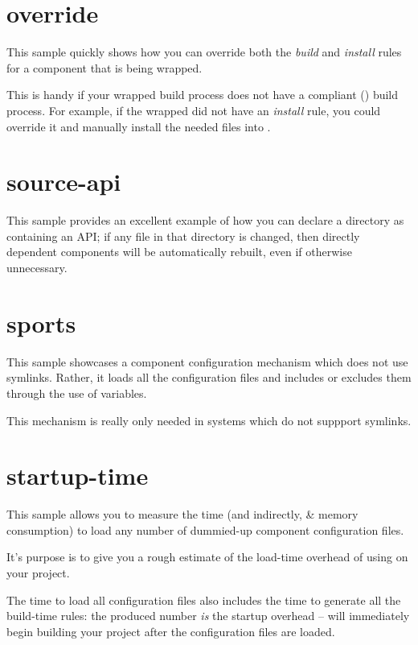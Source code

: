 \section{override}

This sample quickly shows how you can override both the \emph{build}
and \emph{install} rules for a component that is being wrapped.

This is handy if your wrapped build process does not have a compliant
() build process.  For example, if the
wrapped \makefile did not have an \emph{install} rule, you could
override it and manually install the needed files into \destdir.

\section{source-api}

This sample provides an excellent example of how you can declare a
directory as containing an API; if any file in that directory is
changed, then directly dependent components will be automatically
rebuilt, even if otherwise unnecessary.

\section{sports}

This sample showcases a component configuration mechanism which does
not use symlinks.  Rather, it loads all the configuration files and
includes or excludes them through the use of \make variables.

This mechanism is really only needed in systems which do not suppport
symlinks.

\section{startup-time}\label{samples:startup-time}

This sample allows you to measure the time (and indirectly, \lmsbw \&
\make memory consumption) to load any number of dummied-up component
configuration files.

It's purpose is to give you a rough estimate of the load-time overhead
of using \lmsbw on your project.

The time to load all configuration files also includes the time to
generate all the build-time \make rules: the produced number \emph{is}
the startup overhead -- \make will immediately begin building your
project after the configuration files are loaded.

